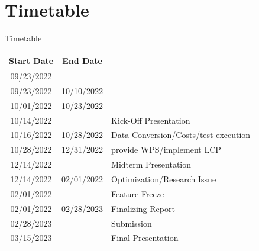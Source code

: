 \documentclass[usenames,dvipsnames,aspectratio=169]{beamer}
\begin{document}
\section{Timetable}
\begin{frame}{Timetable}
\begin{center}
	\begin{small}
	\begin{tabular}{ | c | c | l| }
		\hline
		Start Date & End Date &  \\ 
		\hline\hline
		09/23/2022 & 					& \color{gray}{Project Start}\\
		09/23/2022 & 10/10/2022 	& \color{gray}{Initial Literature Study}\\
		10/01/2022 & 10/23/2022 	& \color{gray}{Initial Data Search}\\
		\hline
		10/14/2022 & 					& Kick-Off Presentation\\
		\hline

		10/16/2022 & 10/28/2022 	& Data Conversion/Costs/test execution\\
		10/28/2022 & 12/31/2022 	& provide WPS/implement LCP\\
		\hline
		12/14/2022 & 					& Midterm  Presentation\\
		\hline
		12/14/2022 & 02/01/2022 	& Optimization/Research Issue\\
		02/01/2022 & 					& Feature Freeze \\ 
		02/01/2022 & 02/28/2023 	& Finalizing Report\\ 
		\hline
		02/28/2023 & 					& Submission  \\
		03/15/2023 & 					& Final Presentation  \\
		\hline   
	\end{tabular}
	\end{small}
\end{center}
\end{frame}
\end{document}
